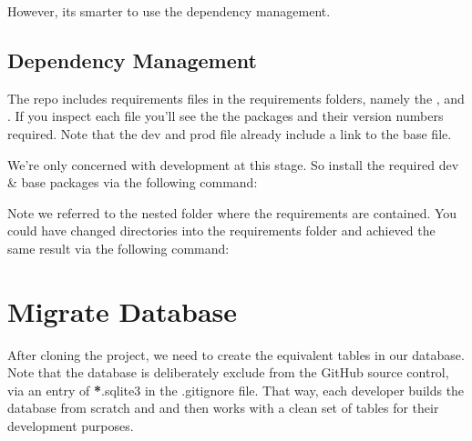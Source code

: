 \documentclass[letterpaper,10pt,english]{sphinxmanual}
\begin{document}
\begin{sphinxVerbatim}[commandchars=\\\{\}]
  
\end{sphinxVerbatim}

However, its smarter to use the dependency management.


\subsection{Dependency Management}
\label{\detokenize{guide/04_packages:dependency-management}}
The repo includes requirements files in the requirements folders, namely the ,  and .  If you inspect each file you’ll see the the packages and their version numbers required.  Note that the dev and prod file already include a link to the base file.

We’re only concerned with development at this stage.  So install the required dev \& base packages via the following command:

\begin{sphinxVerbatim}[commandchars=\\\{\}]
       
  

     
  \PYGZbs{}
\end{sphinxVerbatim}

Note we referred to the nested folder where the requirements are contained.
You could have changed directories into the requirements folder and achieved the same result via the following command:

\begin{sphinxVerbatim}[commandchars=\\\{\}]
  
\end{sphinxVerbatim}


\section{Migrate Database}
\label{\detokenize{guide/05_migrate-database:migrate-database}}\label{\detokenize{guide/05_migrate-database::doc}}
After cloning the project, we need to create the equivalent tables in our database.  Note that the database is deliberately exclude from the GitHub source control, via an entry of {\color{red}\bfseries{}*}.sqlite3 in the .gitignore file.
That way, each developer builds the database from scratch and and then works with a clean set of tables for their development purposes.
\end{document}
